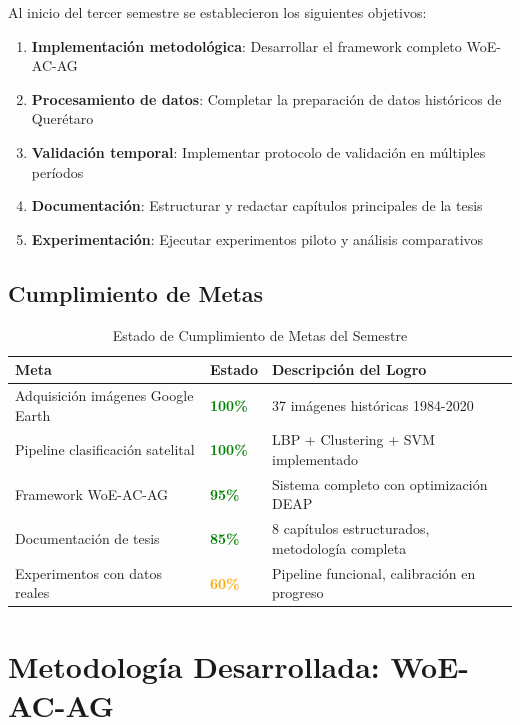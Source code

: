 \documentclass[12pt,letterpaper]{article}
\begin{document}
Al inicio del tercer semestre se establecieron los siguientes objetivos:

\begin{enumerate}
\item \textbf{Implementación metodológica}: Desarrollar el framework completo WoE-AC-AG
\item \textbf{Procesamiento de datos}: Completar la preparación de datos históricos de Querétaro
\item \textbf{Validación temporal}: Implementar protocolo de validación en múltiples períodos
\item \textbf{Documentación}: Estructurar y redactar capítulos principales de la tesis
\item \textbf{Experimentación}: Ejecutar experimentos piloto y análisis comparativos
\end{enumerate}

\subsection{Cumplimiento de Metas}

\begin{table}[H]
\centering
\caption{Estado de Cumplimiento de Metas del Semestre}
\begin{tabular}{p{6cm}p{2cm}p{6cm}}
\toprule
\textbf{Meta} & \textbf{Estado} & \textbf{Descripción del Logro} \\
\midrule
Adquisición imágenes Google Earth & \textcolor{green}{\textbf{100\%}} & 37 imágenes históricas 1984-2020 \\
Pipeline clasificación satelital & \textcolor{green}{\textbf{100\%}} & LBP + Clustering + SVM implementado \\
Framework WoE-AC-AG & \textcolor{green}{\textbf{95\%}} & Sistema completo con optimización DEAP \\
Documentación de tesis & \textcolor{green}{\textbf{85\%}} & 8 capítulos estructurados, metodología completa \\
Experimentos con datos reales & \textcolor{orange}{\textbf{60\%}} & Pipeline funcional, calibración en progreso \\
\bottomrule
\end{tabular}
\end{table}

\section{Metodología Desarrollada: WoE-AC-AG}
\end{document}
